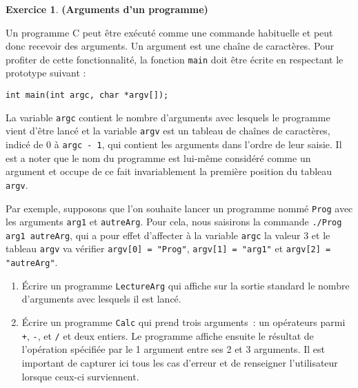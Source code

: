 \documentclass[12pt]{article}
\theoremstyle{definition}
\newtheorem{Exercice}{Exercice}
\begin{document}
\begin{Exercice} {\bf (Arguments d'un programme)}\smallskip

Un programme {\sf C} peut être exécuté comme une commande habituelle et
peut donc recevoir des arguments. Un argument est une chaîne de
caractères. Pour profiter de cette fonctionnalité, la fonction {\tt main}
doit être écrite en respectant le prototype suivant :
\begin{lstlisting}
int main(int argc, char *argv[]);
\end{lstlisting}
La variable {\tt argc} contient le nombre d'arguments avec lesquels le
programme vient d'être lancé et la variable {\tt argv} est un tableau de
chaînes de caractères, indicé de $0$ à {\tt argc - 1}, qui contient les
arguments dans l'ordre de leur saisie. Il est a noter que le nom du
programme est lui-même considéré comme un argument et occupe de ce fait
invariablement la première position du tableau {\tt argv}.
\smallskip

Par exemple, supposons que l'on souhaite lancer un programme nommé
{\tt Prog} avec les arguments {\tt arg1} et {\tt autreArg}. Pour cela,
nous saisirons la commande {\tt ./Prog arg1 autreArg}, qui a pour effet
d'affecter à la variable {\tt argc} la valeur $3$ et le tableau
{\tt argv} va vérifier {\tt argv[0] = "Prog"}, {\tt argv[1] = "arg1"} et
{\tt argv[2] = "autreArg"}.

\begin{enumerate}
    \item Écrire un programme {\tt LectureArg} qui affiche sur la sortie
    standard le nombre d'arguments avec lesquels il est lancé.
    \smallskip

    \item Écrire un programme {\tt Calc} qui prend trois arguments~:
    un opérateurs parmi {\tt +}, {\tt -}, {\tt *} et {\tt /} et deux
    entiers. Le programme affiche ensuite le résultat de l'opération
    spécifiée par le 1\ier{} argument entre ses 2\ieme{} et 3\ieme{}
    arguments. Il est important de capturer ici tous les cas d'erreur
    et de renseigner l'utilisateur lorsque ceux-ci surviennent.
\end{enumerate}
\end{Exercice}
\bigskip
\end{document}
